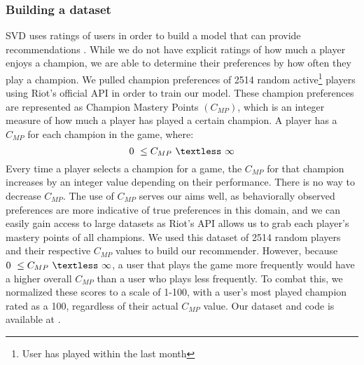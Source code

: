 \documentclass [11pt]{IEEEtran}
\begin{document}
\subsubsection{Building a dataset}
SVD uses ratings of users in order to build a model that can provide recommendations \cite{koren2009matrix}. While we do not have explicit ratings of how much a player enjoys a champion, we are able to determine their preferences by how often they play a champion. We pulled champion preferences of 2514 random active\footnote{User has played within the last month} players using Riot’s official API \cite{riotapi} in order to train our model. These champion preferences are represented as Champion Mastery Points $(C_{MP})$, which is an integer measure of how much a player has played a certain champion. A player has a $C_{MP}$ for each champion in the game, where: 
$$
0 \ \leq C_{MP} \ \textless \ \infty
$$
Every time a player selects a champion for a game, the $C_{MP}$ for that champion increases by an integer value depending on their performance. There is no way to decrease $C_{MP}$. 
The use of $C_{MP}$ serves our aims well, as behaviorally observed preferences are more indicative of true preferences in this domain, and we can easily gain access to large datasets as Riot's API \cite{riotapi} allows us to grab each player's mastery points of all champions. We used this dataset of 2514 random players and their respective $C_{MP}$ values to build our recommender. However, because $0 \ \leq C_{MP} \ \textless \ \infty$, a user that plays the game more frequently would have a higher overall $C_{MP}$ than a user who plays less frequently. To combat this, we normalized these scores to a scale of 1-100, with a user's most played champion rated as a 100, regardless of their actual $C_{MP}$ value. Our dataset and code is available at \cite{github}. 
\end{document}
